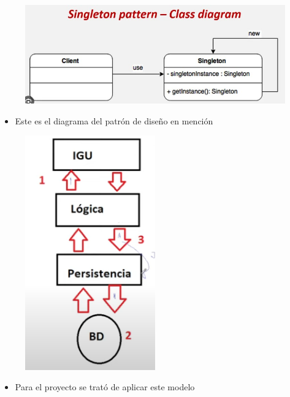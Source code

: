 \documentclass{article}
\begin{document}
	
	\begin{figure}[H]
		\centering
		\includegraphics[width=1\textwidth,keepaspectratio]{img/singleton.jpg}
	\end{figure}

	\begin{itemize}	
		\item Este es el diagrama del patrón de diseño en mención
	\end{itemize}
	
	
		\begin{figure}[H]
		\centering
		\includegraphics[width=0.5\textwidth,keepaspectratio]{img/modelo.png}
	\end{figure}
	
	\begin{itemize}	
		\item Para el proyecto se trató de aplicar este modelo
	\end{itemize}
\end{document}
